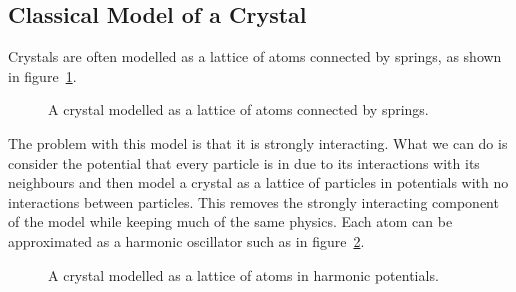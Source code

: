 \documentclass[a4paper]{article}
\begin{document}
    \subsection{Classical Model of a Crystal}
    Crystals are often modelled as a lattice of atoms connected by springs, as shown in figure~\ref{fig:crystal model - spring lattice}.
    \begin{figure}[ht]
        \centering
        \caption{A crystal modelled as a lattice of atoms connected by springs.}
        \label{fig:crystal model - spring lattice}
    \end{figure}
    The problem with this model is that it is strongly interacting.
    What we can do is consider the potential that every particle is in due to its interactions with its neighbours and then model a crystal as a lattice of particles in potentials with no interactions between particles.
    This removes the strongly interacting component of the model while keeping much of the same physics.
    Each atom can be approximated as a harmonic oscillator such as in figure~\ref{fig:crystal model - HO potentials}.
    \begin{figure}[ht]
        \centering
        \caption{A crystal modelled as a lattice of atoms in harmonic potentials.}
        \label{fig:crystal model - HO potentials}
    \end{figure}
\end{document}

